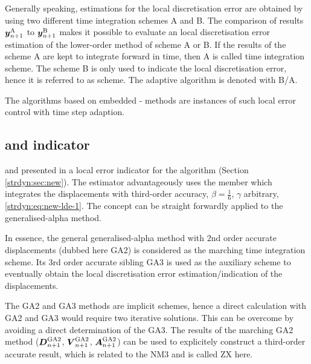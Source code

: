 Generally speaking, estimations for the local discretisation error are
obtained by using two different time integration schemes A and B\@. 
The
comparison of results $\boldsymbol{y}_{n+1}^\text{A}$ to
$\boldsymbol{y}_{n+1}^\text{B}$ makes it possible to evaluate an local discretisation error estimation of
the lower-order method of scheme A or B\@. If
the results of the scheme A are kept to integrate forward 
in time, then A is called  time integration scheme. The scheme
B is only used to indicate the local discretisation error, hence it is referred to as
 scheme. The adaptive algorithm is denoted with B/A\@. 

The algorithms based on 
embedded - methods are instances of such local error
control with time step adaption.

\subsection{ and  indicator}\label{strdyn:sec:zx}
 and  presented in \cite{strdyn:zienkiewicz91} a local
error indicator for the  algorithm (Section
\ref{strdyn:sec:new})\@. The estimator advantageously uses the member which
integrates the displacements with third-order accuracy, \ie{}
$\beta=\frac{1}{6}$, $\gamma$ arbitrary, \cf{} \eqref{strdyn:eq:new-lde-1}\@. The concept can be straight forwardly applied to the generalised-alpha method.

In essence, the general generalised-alpha method with $2$nd order accurate displacements (dubbed here GA2) is considered as the marching time integration scheme. Its $3$rd order accurate sibling GA3 is used as the auxiliary scheme to eventually obtain the
local discretisation error estimation/indication of the displacements. 

The GA2 and GA3 methods are implicit schemes, hence a
direct calculation with GA2 and GA3 would require two
iterative solutions. This can be overcome by avoiding a direct determination
of the GA3\@.
The results of the marching GA2 method ($\boldsymbol{D}_{n+1}^\text{GA2}$,
$\boldsymbol{V}_{n+1}^\text{GA2}$, $\boldsymbol{A}_{n+1}^\text{GA2}$) can be used
to explicitely construct a third-order accurate result, which is related to
the NM3 and is called ZX here\@. 

